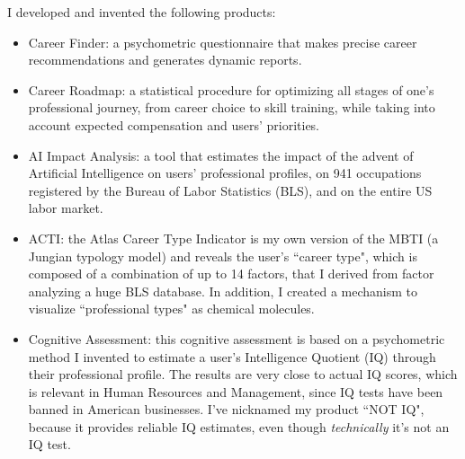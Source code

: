 \begin{cventries}
{\begin{cvitems}
\item {I developed and invented the following products: \begin{itemize}[leftmargin = 0.25cm] \item{Career Finder: a psychometric questionnaire that makes precise career recommendations and generates dynamic reports}. \item{Career Roadmap: a statistical procedure for optimizing all stages of one's professional journey, from career choice to skill training, while taking into account expected compensation and users' priorities.} \item{AI Impact Analysis: a tool that estimates the impact of the advent of Artificial Intelligence on users' professional profiles, on 941 occupations registered by the Bureau of Labor Statistics (BLS), and on the entire US labor market.} \item{ACTI: the Atlas Career Type Indicator is my own version of the MBTI (a Jungian typology model) and reveals the user's ``career type", which is composed of a combination of up to 14 factors, that I derived from factor analyzing a huge BLS database. In addition, I created a mechanism to visualize ``professional types" as chemical molecules.} \item{Cognitive Assessment: this cognitive assessment is based on a psychometric method I invented to estimate a user's Intelligence Quotient (IQ) through their professional profile. The results are very close to actual IQ scores, which is relevant in Human Resources and Management, since IQ tests have been banned in American businesses. I've nicknamed my product ``NOT IQ", because it provides reliable IQ estimates, even though \emph{technically} it's not an IQ test.} \end{itemize}}

\end{cvitems}}
\end{cventries}
